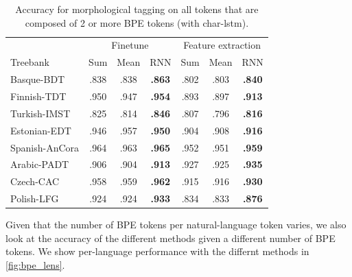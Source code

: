 \documentclass[11pt]{article}
\begin{document}
    
	\begin{table}[h]
	\centering
	\begin{tabular}{l|ccc|ccc}
		 & \multicolumn{3}{c}{Finetune} & \multicolumn{3}{c}{Feature extraction} \\
		Treebank & Sum & Mean & RNN & Sum & Mean & RNN  \\
		 \hline
        Basque-BDT      & .838 & .838 & \textbf{.863} & .802 & .803 & \textbf{.840} \\
		Finnish-TDT     & .950 & .947 & \textbf{.954} & .893 & .897 & \textbf{.913} \\ 
		Turkish-IMST    & .825 & .814 & \textbf{.846} & .807 & .796 & \textbf{.816} \\
		Estonian-EDT    & .946 & .957 & \textbf{.950} & .904 & .908 & \textbf{.916} \\
		Spanish-AnCora  & .964 & .963 & \textbf{.965} & .952 & .951 & \textbf{.959} \\
		Arabic-PADT     & .906 & .904 & \textbf{.913} & .927 & .925 & \textbf{.935}\\
		Czech-CAC       & .958 & .959 & \textbf{.962} & .915 & .916 & \textbf{.930} \\
		Polish-LFG      & .924 & .924 & \textbf{.933} & .834 & .833 & \textbf{.876} \\
	\end{tabular}
	\caption{\label{tab:results_large_tokens} Accuracy for morphological tagging on all tokens that are composed of 2 or more BPE tokens (with char-lstm).}
\end{table}

    
    Given that the number of BPE tokens per natural-language token
     varies, we also look at the accuracy of the different methods
     given a different number of BPE tokens. We show per-language
     performance with the differnt methods in \cref{fig:bpe_lens}.
\end{document}
